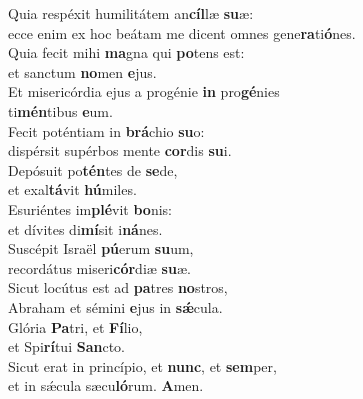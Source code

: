 \oddverse Quia respéxit humilitátem an\textbf{cíl}læ \textbf{su}æ:~\*\\
\oddverse ecce enim ex hoc beátam me dicent omnes gene\textbf{ra}ti\textbf{ó}nes.\\
\evenverse Quia fecit mihi \textbf{ma}gna qui \textbf{po}tens est:~\*\\
\evenverse et sanctum \textbf{no}men \textbf{e}jus.\\
\oddverse Et misericórdia ejus a progénie \textbf{in} pro\textbf{gé}nies~\*\\
\oddverse ti\textbf{mén}tibus \textbf{e}um.\\
\evenverse Fecit poténtiam in \textbf{brá}chio \textbf{su}o:~\*\\
\evenverse dispérsit supérbos mente \textbf{cor}dis \textbf{su}i.\\
\oddverse Depósuit po\textbf{tén}tes de \textbf{se}de,~\*\\
\oddverse et exal\textbf{tá}vit \textbf{hú}miles.\\
\evenverse Esuriéntes im\textbf{plé}vit \textbf{bo}nis:~\*\\
\evenverse et dívites di\textbf{mí}sit i\textbf{ná}nes.\\
\oddverse Suscépit Israël \textbf{pú}erum \textbf{su}um,~\*\\
\oddverse recordátus miseri\textbf{cór}diæ \textbf{su}æ.\\
\evenverse Sicut locútus est ad \textbf{pa}tres \textbf{no}stros,~\*\\
\evenverse Abraham et sémini \textbf{e}jus in \textbf{sǽ}cula.\\
\oddverse Glória \textbf{Pa}tri, et \textbf{Fí}lio,~\*\\
\oddverse et Spi\textbf{rí}tui \textbf{San}cto.\\
\evenverse Sicut erat in princípio, et \textbf{nunc}, et \textbf{sem}per,~\*\\
\evenverse et in sǽcula sæcu\textbf{ló}rum. \textbf{A}men.\\

